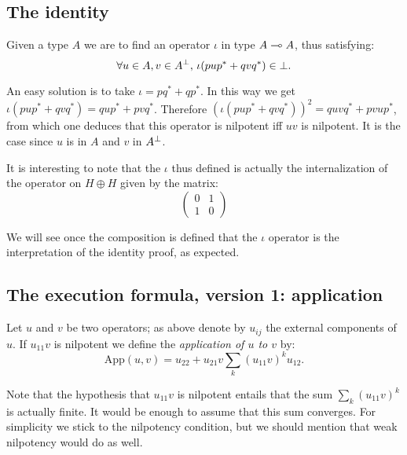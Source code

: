 \subsection{The identity}\label{the-identity}

Given a type \(A\) we are to find an operator \(\iota\) in type
\(A\multimap A\), thus satisfying:
\begin{equation*}
\forall u\in A, v\in A^\bot,\, \iota(pup^* + qvq^*)\in\bot.
\end{equation*}

An easy solution is to take \(\iota = pq^* + qp^*\). In this way we get
\(\iota(pup^* + qvq^*) = qup^* + pvq^*\). Therefore
\((\iota(pup^* + qvq^*))^2 = quvq^* + pvup^*\), from which one deduces
that this operator is nilpotent iff \(uv\) is nilpotent. It is the case
since \(u\) is in \(A\) and \(v\) in \(A^\bot\).

It is interesting to note that the \(\iota\) thus defined is actually
the internalization of the operator on \(H\oplus H\) given by the
matrix:
\begin{equation*}
  \begin{pmatrix}0 & 1\\1 & 0\end{pmatrix}
\end{equation*}

We will see once the composition is defined that the \(\iota\) operator
is the interpretation of the identity proof, as expected.

\subsection{The execution formula, version 1: application}\label{the-execution-formula-version-1-application}

\begin{definition}
Let $u$ and $v$ be two operators; as above denote by $u_{ij}$ the external components of $u$. If $u_{11}v$ is nilpotent we define the \emph{application of $u$ to $v$} by:
\begin{equation*}
\mathrm{App}(u,v) = u_{22} + u_{21}v\sum_k(u_{11}v)^ku_{12}.
\end{equation*}
\end{definition}

Note that the hypothesis that \(u_{11}v\) is nilpotent entails that the
sum \(\sum_k(u_{11}v)^k\) is actually finite. It would be enough to
assume that this sum converges. For simplicity we stick to the
nilpotency condition, but we should mention that weak nilpotency would
do as well.

